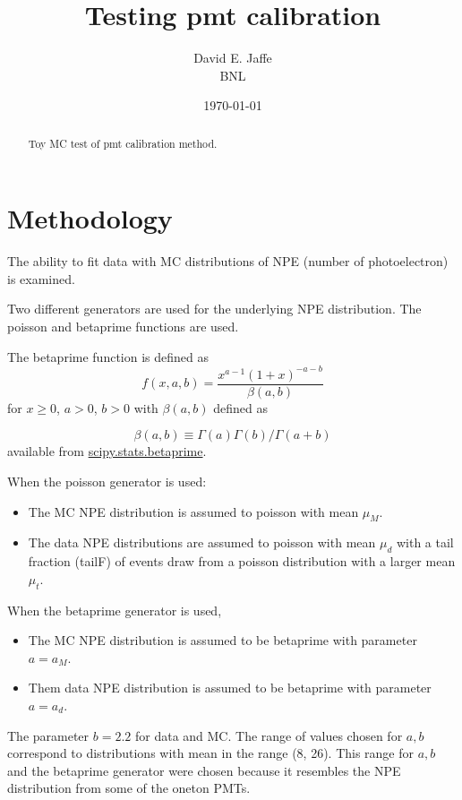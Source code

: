\documentclass[12pt]{article}
\begin{document}
\doublespacing

\title{Testing pmt calibration}

\author{David E. Jaffe \\ BNL}
\date{\today}
\maketitle
\begin{abstract}
{
Toy MC test of pmt calibration method.
}
\end{abstract}

\section{Methodology}

The ability to fit data with MC distributions of NPE (number of photoelectron) is examined.

Two different generators are used for the underlying NPE distribution. 
The poisson and betaprime functions are used. 

The betaprime function is defined as 
\begin{equation}\label{eqn:betaprime}
f(x,a,b) = \frac{x^{a-1} (1+x)^{-a-b}}{\beta(a,b)}
\end{equation}
\noindent for $x\ge 0$, $a>0$, $b>0$ with $\beta(a,b)$ defined as

\begin{equation}\label{eqn:beta}
\beta(a,b) \equiv \Gamma(a)\Gamma(b)/\Gamma(a+b)
\end{equation}
available from \href{https://docs.scipy.org/doc/scipy/reference/generated/scipy.stats.betaprime.html}{\color{blue}scipy.stats.betaprime}.

When the poisson generator is used:
\begin{itemize}
\item The MC NPE distribution is assumed to poisson with mean $\mu_M$.
\item The data NPE distributions are assumed to poisson with mean $\mu_d$ with 
	a tail fraction (tailF) of events draw from a poisson distribution with a larger mean $\mu_t$.
\end{itemize}

When the betaprime generator is used, 
\begin{itemize}
\item The MC NPE distribution is assumed to be betaprime with parameter $a = a_M$.
\item Them data NPE distribution is assumed to be betaprime with parameter $a = a_d$.
\end{itemize}
The parameter $b = 2.2$ for data and MC. The range of values chosen for $a, b$ correspond 
to distributions with mean in the range (8, 26). 
This range for $a, b$ and the betaprime generator were chosen because it resembles the NPE distribution from some of the oneton PMTs. 
\end{document}
